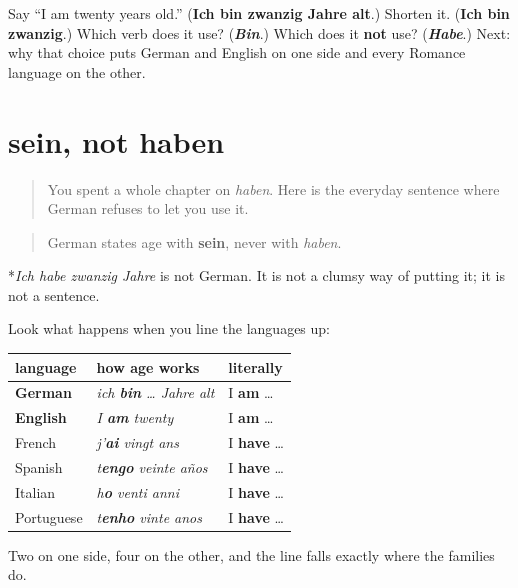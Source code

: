 \begin{tcolorbox}[breakable,colback=teal!4,colframe=teal!35!black,title={Before you move on}]
Say \textquotedblleft{}I am twenty years old.\textquotedblright{} (\textbf{Ich bin zwanzig Jahre alt}.) Shorten it. (\textbf{Ich bin zwanzig}.) Which verb does it use? (\emph{\textbf{Bin}}.) Which does it \textbf{not} use? (\emph{\textbf{Habe}}.) Next: why that choice puts German and English on one side and every Romance language on the other.
\end{tcolorbox}
\section[sein, nicht haben]{sein, not haben}

\label{lesson:GE-C14-alter-sein-haben}



\begin{quote}
You spent a whole chapter on \emph{haben}. Here is the everyday sentence where German refuses to let you use it.
\end{quote}

\begin{grammarlens}[title={Grammar Lens: you ARE your years}]
\begin{quote}
German states age with \textbf{sein}, never with \emph{haben}.
\end{quote}

*\emph{Ich habe zwanzig Jahre} is not German. It is not a clumsy way of putting it; it is not a sentence.

Look what happens when you line the languages up:

\noindent
\begin{tabularx}{\linewidth}{@{}>{\raggedright\arraybackslash}X>{\raggedright\arraybackslash}X>{\raggedright\arraybackslash}X@{}}
\toprule
\textbf{language} & \textbf{how age works} & \textbf{literally} \\
\midrule
\textbf{German} & \emph{ich \textbf{bin} … Jahre alt} & I \textbf{am} … \\
\textbf{English} & \emph{I \textbf{am} twenty} & I \textbf{am} … \\
French & \emph{j'\textbf{ai} vingt ans} & I \textbf{have} … \\
Spanish & \emph{t\textbf{engo} veinte años} & I \textbf{have} … \\
Italian & \emph{h\textbf{o} venti anni} & I \textbf{have} … \\
Portuguese & \emph{t\textbf{enho} vinte anos} & I \textbf{have} … \\
\bottomrule
\end{tabularx}

Two on one side, four on the other, and the line falls exactly where the families do.
\end{grammarlens}

